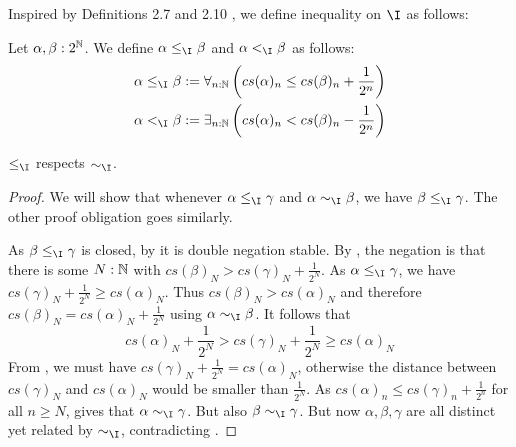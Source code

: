 Inspired by Definitions 2.7 and 2.10 \Cite{Bishop}, 
we define inequality on $\I$ as follows:
\begin{definition}
  Let $\alpha,\beta:2^{\mathbb{N}}$. 
  We define $\alpha\leq_\I \beta$ and $\alpha<_\I\beta$ as follows:
  \begin{align}
  \alpha\leq_\I\beta : = \forall_{n:\N} \left( cs(\alpha)_n \leq cs(\beta)_n + \frac {1} {2^n}\right)\\ 
    \alpha   <_\I \beta : = \exists_{n:\N} \left( cs(\alpha)_n < cs(\beta)_n - \frac {1} {2^n}\right)
\end{align}
\end{definition}
\begin{lemma}
  $\leq_\I$ respects $\sim_\I$. 
\end{lemma}
\begin{proof}
  We will show that whenever $\alpha\leq_\I \gamma$ and $\alpha\sim_\I\beta$, we have $\beta\leq_\I\gamma$. 
  The other proof obligation goes similarly. 


  As $\beta\leq_\I\gamma$ is closed, by  it is double negation stable. 
  By , the negation is that there is some 
  $N:\mathbb{N}$ with 
  $cs(\beta)_N > cs(\gamma)_N + \frac{1}{2^N}.$
  As $\alpha\leq_\I\gamma$, we have 
  $cs(\gamma)_N + \frac{1}{2^N}\geq cs(\alpha)_N $. 
  Thus $cs(\beta)_N > cs(\alpha)_N$ and therefore $cs(\beta)_N = cs(\alpha)_N+\frac{1}{2^N}$ using  $\alpha\sim_\I\beta$.
  It follows that 
  $$
  cs(\alpha)_N+\frac{1}{2^N} > cs(\gamma)_N + \frac{1}{2^N} \geq cs(\alpha)_N
  $$
  From , we must have
  $cs(\gamma)_N  + \frac{1}{2^N} = cs(\alpha)_N$, otherwise the distance 
  between $cs(\gamma)_N$ and $cs(\alpha)_N$ 
  would be smaller than $\frac{1}{2^N}$.
  As $cs(\alpha)_n \leq cs(\gamma)_n + \frac{1}{2^n}$ for all $n\geq N$, 
   gives that 
  $\alpha\sim_\I\gamma$. But also $\beta\sim_\I\gamma$. 
  But now $\alpha,\beta,\gamma$ are all distinct yet related by $\sim_\I$, contradicting 
  . 
\end{proof}

